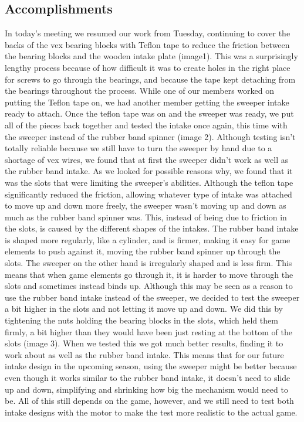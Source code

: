 \subsection*{Accomplishments}
In today’s meeting we resumed our work from Tuesday, continuing to cover the backs of the vex bearing blocks with Teflon tape to reduce the friction between the bearing blocks and the wooden intake plate (image1). This was a surprisingly lengthy process because of how difficult it was to create holes in the right place for screws to go through the bearings, and because the tape kept detaching from the bearings throughout the process.
While one of our members worked on putting the Teflon tape on, we had another member getting the sweeper intake ready to attach. Once the teflon tape was on and the sweeper was ready, we put all of the pieces back together and tested the intake once again, this time with the sweeper instead of the rubber band spinner (image 2). Although testing isn’t totally reliable because we still have to turn the sweeper by hand due to a shortage of vex wires, we found that at first the sweeper didn’t work as well as the rubber band intake. As we looked for possible reasons why, we found that it was the slots that were limiting the sweeper’s abilities. Although the teflon tape significantly reduced the friction, allowing whatever type of intake was attached to move up and down more freely, the sweeper wasn’t moving up and down as much as the rubber band spinner was. This, instead of being due to friction in the slots, is caused by the different shapes of the intakes. The rubber band intake is shaped more regularly, like a cylinder, and is firmer, making it easy for game elements to push against it, moving the rubber band spinner up through the slots. The sweeper on the other hand is irregularly shaped and is less firm. This means that when game elements go through it, it is harder to move through the slots and sometimes instead binds up.
Although this may be seen as a reason to use the rubber band intake instead of the sweeper, we decided to test the sweeper a bit higher in the slots and not letting it move up and down. We did this by tightening the nuts holding the bearing blocks in the slots, which held them firmly, a bit higher than they would have been just resting at the bottom of the slots (image 3). When we tested this we got much better results, finding it to work about as well as the rubber band intake. This means that for our future intake design in the upcoming season, using the sweeper might be better because even though it works similar to the rubber band intake, it doesn't need to slide up and down, simplifying and shrinking how big the mechanism would need to be. All of this still depends on the game, however, and we still need to test both intake designs with the motor to make the test more realistic to the actual game.


